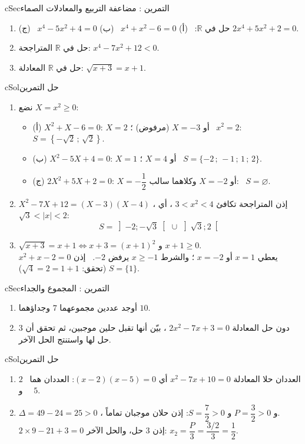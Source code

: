 \documentclass[12pt,a4paper]{article}
\newenvironment{BOX}[2]{\begin{otherlanguage}{english}\begin{arbox}{#1}{#2}}{\end{arbox}\end{otherlanguage}}
\newcounter{exo}
\newenvironment{tamrin}[1]{\stepcounter{exo}\begin{BOX}{cSec}{التمرين \theexo: #1}}{\end{BOX}}
\newenvironment{hal}{\Needspace{12\baselineskip}\begin{otherlanguage}{english}\begin{arbox}[breakable]{cSol}{حل التمرين \theexo}}{\end{arbox}\end{otherlanguage}}
\newcommand{\R}{\mathbb{R}}
\begin{document}
\begin{tamrin}{مضاعفة التربيع والمعادلات الصماء}
\begin{enumerate}
\item حل في $\R$: \ (أ) $x^4+x^2-6=0$ \ (ب) $x^4-5x^2+4=0$ \ (ج) $2x^4+5x^2+2=0$.
\item حل في $\R$ المتراجحة: $x^4-7x^2+12<0$.
\item حل في $\R$ المعادلة: $\sqrt{x+3}=x+1$.
\end{enumerate}
\end{tamrin}
\begin{hal}
\begin{enumerate}
\item نضع $X=x^2\ge0$:
\begin{itemize}
\item (أ) $X^2+X-6=0$: $X=2$ أو $X=-3$ (مرفوض) ؛ \ $x^2=2$: \ $S=\left\{-\sqrt2\,;\,\sqrt2\right\}$.
\item (ب) $X^2-5X+4=0$: $X=1$ أو $X=4$ ؛ \ $S=\{-2\,;\,-1\,;\,1\,;\,2\}$.
\item (ج) $2X^2+5X+2=0$: $X=-\dfrac12$ أو $X=-2$ وكلاهما سالب: \ $S=\varnothing$.
\end{itemize}
\item $X^2-7X+12=(X-3)(X-4)$ ، إذن المتراجحة تكافئ $3<x^2<4$ ، أي $\sqrt3<|x|<2$:
\[S=\left]-2;-\sqrt3\right[\,\cup\,\left]\sqrt3;2\right[\]
\item $\sqrt{x+3}=x+1\iff x+3=(x+1)^2$ و $x+1\ge0$.\\
$x^2+x-2=0$ يعطي $x=1$ أو $x=-2$ ؛ والشرط $x\ge-1$ يرفض $-2$. \ إذن $\boxed{S=\{1\}}$ (تحقق: $\sqrt4=2=1+1$).
\end{enumerate}
\end{hal}

\begin{tamrin}{المجموع والجداء}
\begin{enumerate}
\item أوجد عددين مجموعهما $7$ وجداؤهما $10$.
\item دون حل المعادلة $2x^2-7x+3=0$ ، بيّن أنها تقبل حلين موجبين، ثم تحقق أن $3$ حل لها واستنتج الحل الآخر.
\end{enumerate}
\end{tamrin}
\begin{hal}
\begin{enumerate}
\item العددان حلا المعادلة $x^2-7x+10=0$ أي $(x-2)(x-5)=0$: العددان هما \ $\boxed{2}$ \ و \ $\boxed{5}$.
\item $\Delta=49-24=25>0$ ، و $P=\dfrac32>0$ و $S=\dfrac72>0$: إذن حلان موجبان تماماً.\\
$2\times9-21+3=0$ إذن $3$ حل، والحل الآخر: $x_2=\dfrac{P}{3}=\dfrac{3/2}{3}=\boxed{\dfrac12}$.
\end{enumerate}
\end{hal}
\end{document}
